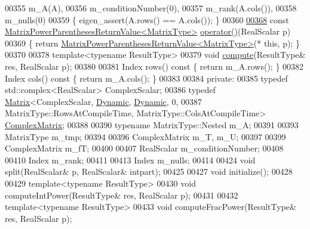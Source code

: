 \begin{DoxyCode}
00355       m\_A(A),
00356       m\_conditionNumber(0),
00357       m\_rank(A.cols()),
00358       m\_nulls(0)
00359     \{ eigen\_assert(A.rows() == A.cols()); \}
00360 
\hyperlink{class_eigen_1_1_matrix_power_a2ad22d156b1a7ff12d6c40a093cd95eb}{00368}     \textcolor{keyword}{const} \hyperlink{class_eigen_1_1_matrix_power_parentheses_return_value}{MatrixPowerParenthesesReturnValue<MatrixType>} 
      \hyperlink{class_eigen_1_1_matrix_power_a2ad22d156b1a7ff12d6c40a093cd95eb}{operator()}(RealScalar p)
00369     \{ \textcolor{keywordflow}{return} \hyperlink{class_eigen_1_1_matrix_power_parentheses_return_value}{MatrixPowerParenthesesReturnValue<MatrixType>}(*\textcolor{keyword}{
      this}, p); \}
00370 
00378     \textcolor{keyword}{template}<\textcolor{keyword}{typename} ResultType>
00379     \textcolor{keywordtype}{void} \hyperlink{class_eigen_1_1_matrix_power_atomic_ac3cdfb54a5b60079d068784534cbc174}{compute}(ResultType& res, RealScalar p);
00380     
00381     Index rows()\textcolor{keyword}{ const }\{ \textcolor{keywordflow}{return} m\_A.rows(); \}
00382     Index cols()\textcolor{keyword}{ const }\{ \textcolor{keywordflow}{return} m\_A.cols(); \}
00383 
00384   \textcolor{keyword}{private}:
00385     \textcolor{keyword}{typedef} std::complex<RealScalar> ComplexScalar;
00386     \textcolor{keyword}{typedef} \hyperlink{group___core___module_class_eigen_1_1_matrix}{Matrix}<ComplexScalar, \hyperlink{namespace_eigen_ad81fa7195215a0ce30017dfac309f0b2}{Dynamic}, \hyperlink{namespace_eigen_ad81fa7195215a0ce30017dfac309f0b2}{Dynamic}, 0,
00387               MatrixType::RowsAtCompileTime, MatrixType::ColsAtCompileTime> 
      \hyperlink{group___core___module}{ComplexMatrix};
00388 
00390     \textcolor{keyword}{typename} MatrixType::Nested m\_A;
00391 
00393     MatrixType m\_tmp;
00394 
00396     ComplexMatrix m\_T, m\_U;
00397     
00399     ComplexMatrix m\_fT;
00400 
00407     RealScalar m\_conditionNumber;
00408 
00410     Index m\_rank;
00411     
00413     Index m\_nulls;
00414 
00424     \textcolor{keywordtype}{void} split(RealScalar& p, RealScalar& intpart);
00425 
00427     \textcolor{keywordtype}{void} initialize();
00428 
00429     \textcolor{keyword}{template}<\textcolor{keyword}{typename} ResultType>
00430     \textcolor{keywordtype}{void} computeIntPower(ResultType& res, RealScalar p);
00431 
00432     \textcolor{keyword}{template}<\textcolor{keyword}{typename} ResultType>
00433     \textcolor{keywordtype}{void} computeFracPower(ResultType& res, RealScalar p);

\end{DoxyCode}
